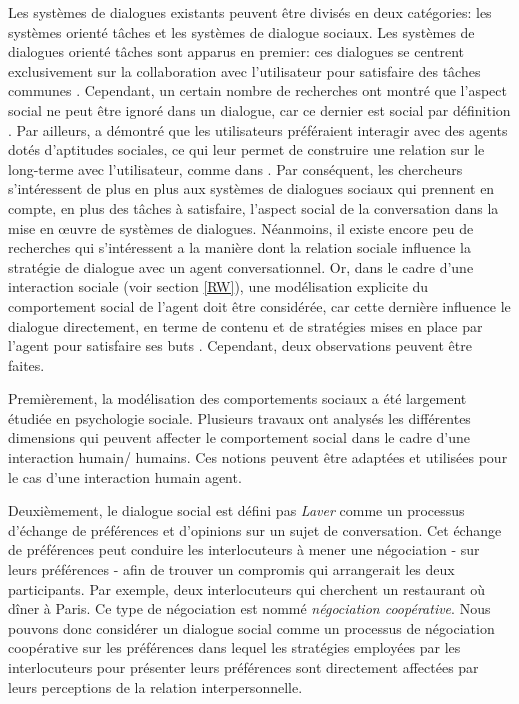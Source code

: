\documentclass [french]{sig-alternate-05-2015}
\begin{document}
Les systèmes de dialogues existants peuvent être divisés en deux catégories: les systèmes orienté tâches et les systèmes de dialogue sociaux. Les systèmes de dialogues orienté tâches sont apparus en premier: ces dialogues se centrent exclusivement sur la collaboration avec l'utilisateur pour satisfaire des tâches communes \cite{allen1995spoken, allen1996robust}. Cependant, un certain nombre de recherches ont montré que l'aspect social ne peut être ignoré dans un dialogue, car ce dernier est social par définition \cite{markopoulos2005case}. Par ailleurs, \cite{moon1998intimate} a démontré que les utilisateurs préféraient interagir avec des agents dotés d'aptitudes sociales, ce qui leur permet de construire une relation sur le long-terme avec l'utilisateur, comme  dans \cite{bickmore2005establishing}. Par conséquent, les chercheurs s'intéressent de plus en plus aux systèmes de dialogues sociaux qui prennent en compte, en plus des tâches à satisfaire, l'aspect social de la conversation dans la mise en œuvre de systèmes de dialogues. Néanmoins, il existe encore peu de recherches qui s'intéressent a la manière dont la relation sociale influence la stratégie de dialogue avec un agent conversationnel. Or, dans le cadre d'une interaction  sociale (voir section \ref{RW}), une modélisation explicite du comportement social de l'agent doit être considérée, car cette dernière influence le dialogue directement, en terme de contenu et de stratégies mises en place par l'agent pour satisfaire ses buts \cite{bickmore2012empirical}. Cependant, deux observations peuvent être faites.

\par Premièrement, la modélisation des comportements sociaux a été largement étudiée en psychologie sociale. Plusieurs travaux ont analysés les différentes dimensions qui peuvent affecter le comportement social dans le cadre d'une interaction humain/ humains. Ces notions peuvent être adaptées et utilisées pour le cas d'une interaction humain agent.

 \par Deuxièmement, le dialogue social est défini pas \emph{Laver}\cite{laver1981linguistic} comme un processus d'échange de préférences et d'opinions sur un sujet de conversation. Cet échange de préférences peut conduire les interlocuteurs à mener une négociation - sur leurs préférences - afin de trouver un compromis qui arrangerait les deux participants. Par exemple, deux interlocuteurs qui cherchent un restaurant où dîner à Paris. Ce type de négociation est nommé \emph{négociation coopérative}. Nous pouvons donc considérer un dialogue social comme un processus de négociation coopérative sur les préférences dans lequel les stratégies employées par les interlocuteurs pour présenter leurs préférences sont directement affectées par leurs perceptions de la relation interpersonnelle.
\end{document}
